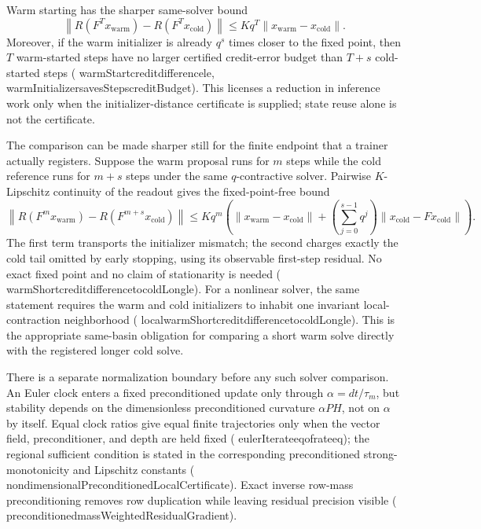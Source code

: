 \documentclass[11pt]{article}
\newcommand{\leanname}[1]{{\scriptsize\ttfamily
  \def\_{\textunderscore\allowbreak}#1}}
\begin{document}
Warm starting has the sharper same-solver bound
\[
 \left\|R(F^T x_{\mathrm{warm}})-R(F^T x_{\mathrm{cold}})\right\|
 \leq Kq^T\|x_{\mathrm{warm}}-x_{\mathrm{cold}}\|.
\]
Moreover, if the warm initializer is already $q^s$ times closer to the fixed point, then
$T$ warm-started steps have no larger certified credit-error budget than $T+s$
cold-started steps
(\leanname{warmStart\_credit\_difference\_le},
\leanname{warmInitializer\_savesSteps\_creditBudget}). This licenses a reduction in
inference work only when the initializer-distance certificate is supplied; state reuse
alone is not the certificate.

The comparison can be made sharper still for the finite endpoint that a trainer actually
registers. Suppose the warm proposal runs for $m$ steps while the cold reference runs for
$m+s$ steps under the same $q$-contractive solver. Pairwise $K$-Lipschitz continuity of
the readout gives the fixed-point-free bound
\[
 \left\|R(F^m x_{\mathrm{warm}})-R(F^{m+s}x_{\mathrm{cold}})\right\|
 \leq Kq^m\left(
   \|x_{\mathrm{warm}}-x_{\mathrm{cold}}\|+
   \left(\sum_{j=0}^{s-1}q^j\right)
     \|x_{\mathrm{cold}}-F x_{\mathrm{cold}}\|
 \right).
\]
The first term transports the initializer mismatch; the second charges exactly the cold
tail omitted by early stopping, using its observable first-step residual. No exact fixed
point and no claim of stationarity is needed
(\leanname{warmShort\_credit\_difference\_to\_coldLong\_le}). For a nonlinear solver,
the same statement requires the warm and cold initializers to inhabit one invariant
local-contraction neighborhood
(\leanname{local\_warmShort\_credit\_difference\_to\_coldLong\_le}). This is the
appropriate same-basin obligation for comparing a short warm solve directly with the
registered longer cold solve.

There is a separate normalization boundary before any such solver comparison. An
Euler clock enters a fixed preconditioned update only through
$\alpha=dt/\tau_m$, but stability depends on the dimensionless preconditioned
curvature $\alpha PH$, not on $\alpha$ by itself. Equal clock ratios give equal
finite trajectories only when the vector field, preconditioner, and depth are held
fixed (\leanname{eulerIterate\_eq\_of\_rate\_eq}); the regional sufficient
condition is stated in the corresponding preconditioned strong-monotonicity and
Lipschitz constants
(\leanname{nondimensionalPreconditionedLocalCertificate}). Exact inverse row-mass
preconditioning removes row duplication while leaving residual precision visible
(\leanname{preconditioned\_massWeightedResidualGradient}).
\end{document}
